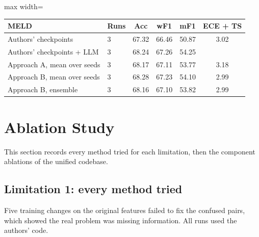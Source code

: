 \documentclass[11pt,a4paper]{article}
\begin{document}
\begin{center}
\begin{adjustbox}{max width=\linewidth}
\begin{tabular}{llcccc}
\toprule
MELD & Runs & Acc & wF1 & mF1 & ECE + TS \\
\midrule
Authors' checkpoints & 3 & 67.32 & 66.46 & 50.87 & 3.02 \\
Authors' checkpoints + LLM & 3 & 68.24 & 67.26 & 54.25 & \\
Approach A, mean over seeds & 3 & 68.17 & 67.11 & 53.77 & 3.18 \\
Approach B, mean over seeds & 3 & 68.28 & 67.23 & 54.10 & 2.99 \\
Approach B, ensemble & 3 & 68.16 & 67.10 & 53.82 & 2.99 \\
\bottomrule
\end{tabular}
\end{adjustbox}
\end{center}

\section{Ablation Study}
\label{sec:ablation}

This section records every method tried for each limitation, then the component ablations of the unified codebase.

\subsection{Limitation 1: every method tried}
\label{sec:abl-l1}

Five training changes on the original features failed to fix the confused pairs, which showed the real problem was missing information. All runs used the authors' code.
\end{document}
